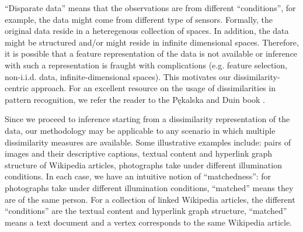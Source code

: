 \documentclass[12pt]{article} %
\begin{document}
     ``Disparate data''  means that  the observations are from  different ``conditions'', for example, the data might come from different type of sensors. Formally, the original data  reside in a heteregenous collection of  spaces.  In addition, the data might be structured and/or might reside in  infinite dimensional spaces. Therefore, it is possible that a feature representation of the data is not available or inference with such a representation is fraught with complications (e.g. feature selection, non-i.i.d. data, infinite-dimensional spaces). This motivates our  dissimilarity-centric approach. For an excellent resource on the usage of dissimilarities in pattern recognition, we refer the reader to the P\k{e}kalska and Duin book \cite{duin2005dissimilarity}.
		
		Since we proceed to inference starting from a dissimilarity representation of the data, our methodology may be applicable to any scenario in which multiple dissimilarity measures are available.  Some illustrative examples include:  pairs of images and their descriptive captions,  textual content  and  hyperlink graph
structure of  Wikipedia  articles, photographs take under different illumination conditions. In each case, we have an intuitive notion of ``matchedness'': for photographs take under different illumination conditions, ``matched'' means they are of the same person. For a collection of linked Wikipedia articles, the different ``conditions''  are  the textual content and hyperlink graph structure, ``matched'' means a text document and  a vertex  corresponds to the same Wikipedia article. 

\end{document}
